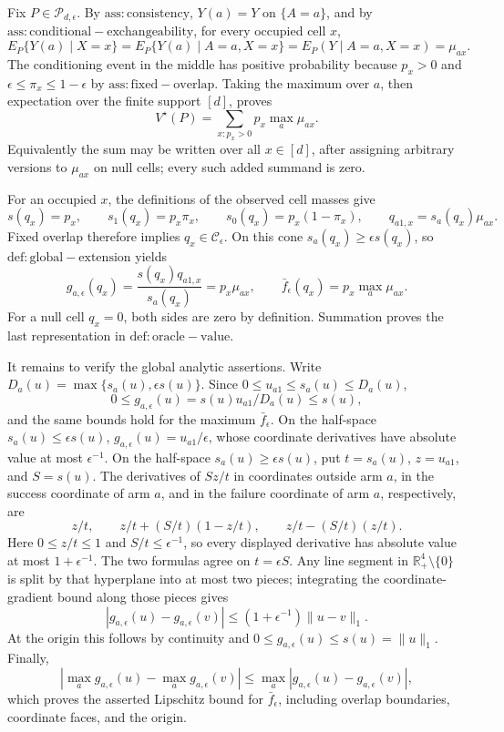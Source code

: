 Fix \(P\in\mathcal P_{d,\epsilon}\).  By \(\mathrm{ass:consistency}\), \(Y(a)=Y\) on \(\{A=a\}\), and by \(\mathrm{ass:conditional-exchangeability}\), for every occupied cell \(x\),
\[
 E_P\{Y(a)\mid X=x\}=E_P\{Y(a)\mid A=a,X=x\}=E_P(Y\mid A=a,X=x)=\mu_{ax}.
\]
The conditioning event in the middle has positive probability because \(p_x>0\) and \(\epsilon\leq\pi_x\leq1-\epsilon\) by \(\mathrm{ass:fixed-overlap}\).  Taking the maximum over \(a\), then expectation over the finite support \([d]\), proves
\[
 V^\star(P)=\sum_{x:p_x>0}p_x\max_a\mu_{ax}.
\]
Equivalently the sum may be written over all \(x\in[d]\), after assigning arbitrary versions to \(\mu_{ax}\) on null cells; every such added summand is zero.

For an occupied \(x\), the definitions of the observed cell masses give
\[
 s(q_x)=p_x,\qquad s_1(q_x)=p_x\pi_x,\qquad
 s_0(q_x)=p_x(1-\pi_x),\qquad q_{a1,x}=s_a(q_x)\mu_{ax}.
\]
Fixed overlap therefore implies \(q_x\in\mathcal C_\epsilon\).  On this cone \(s_a(q_x)\geq\epsilon s(q_x)\), so \(\mathrm{def:global-extension}\) yields
\[
 g_{a,\epsilon}(q_x)
 =\frac{s(q_x)q_{a1,x}}{s_a(q_x)}
 =p_x\mu_{ax},
 \qquad
 \bar f_\epsilon(q_x)=p_x\max_a\mu_{ax}.
\]
For a null cell \(q_x=0\), both sides are zero by definition.  Summation proves the last representation in \(\mathrm{def:oracle-value}\).

It remains to verify the global analytic assertions.  Write \(D_a(u)=\max\{s_a(u),\epsilon s(u)\}\).  Since \(0\leq u_{a1}\leq s_a(u)\leq D_a(u)\),
\[
 0\leq g_{a,\epsilon}(u)=s(u)u_{a1}/D_a(u)\leq s(u),
\]
and the same bounds hold for the maximum \(\bar f_\epsilon\).  On the half-space \(s_a(u)\leq\epsilon s(u)\), \(g_{a,\epsilon}(u)=u_{a1}/\epsilon\), whose coordinate derivatives have absolute value at most \(\epsilon^{-1}\).  On the half-space \(s_a(u)\geq\epsilon s(u)\), put \(t=s_a(u)\), \(z=u_{a1}\), and \(S=s(u)\).  The derivatives of \(Sz/t\) in coordinates outside arm \(a\), in the success coordinate of arm \(a\), and in the failure coordinate of arm \(a\), respectively, are
\[
 z/t,\qquad z/t+(S/t)(1-z/t),\qquad z/t-(S/t)(z/t).
\]
Here \(0\leq z/t\leq1\) and \(S/t\leq\epsilon^{-1}\), so every displayed derivative has absolute value at most \(1+\epsilon^{-1}\).  The two formulas agree on \(t=\epsilon S\).  Any line segment in \(\mathbb R_+^4\setminus\{0\}\) is split by that hyperplane into at most two pieces; integrating the coordinate-gradient bound along those pieces gives
\[
 |g_{a,\epsilon}(u)-g_{a,\epsilon}(v)|
 \leq(1+\epsilon^{-1})\|u-v\|_1.
\]
At the origin this follows by continuity and \(0\leq g_{a,\epsilon}(u)\leq s(u)=\|u\|_1\).  Finally,
\[
 |\max_a g_{a,\epsilon}(u)-\max_a g_{a,\epsilon}(v)|
 \leq\max_a|g_{a,\epsilon}(u)-g_{a,\epsilon}(v)|,
\]
which proves the asserted Lipschitz bound for \(\bar f_\epsilon\), including overlap boundaries, coordinate faces, and the origin.